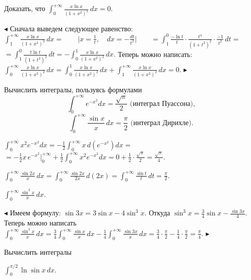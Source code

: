 \documentclass[a5paper,10pt]{article}
\begin{document}
\medskip
{} Доказать, что $\displaystyle \int_{0}^{+\infty}
\frac{x\ln x}{(1+x^2)^2}\,dx=0$.

\smallskip
\noindent $\blacktriangleleft$ Сначала выведем следующее равенство:\\
$\displaystyle \int_{1}^{+\infty}\frac{x\ln x}{(1+x^2)^2}\,dx=\qquad\Big|x=\frac1t,\quad dx=-\frac{dt}{t^2}\Big|\qquad =\int_{1}^{0}\frac{-\ln t}{t}\cdot\frac{t^4}{(1+t^2)^2}\cdot\frac{-1}{t^2}\,dt=$\\
$\displaystyle =\int_{1}^{0}\frac{t\ln t}{(1+t^2)^2}\,dt=-\int_{0}^{1}\frac{x\ln x}{(1+x^2)^2}\,dx.$\quad
Теперь можно написать:\\
$\displaystyle \int_{0}^{+\infty}\frac{x\ln x}{(1+x^2)^2}\,dx=
\int_{0}^{1}\frac{x\ln x}{(1+x^2)^2}\,dx+\int_{1}^{+\infty}\frac{x\ln x}{(1+x^2)^2}\,dx=0.$ $\blacktriangleright$

\bigskip\noindent Вычислить интегралы, пользуясь формулами
$$\int_0^{+\infty}e^{-x^2}dx=\frac{\sqrt\pi}{2}\mbox{ (интеграл Пуассона),}$$
$$\int_0^{+\infty}\frac{\sin x}{x}\,dx=\frac{\pi}{2}\mbox{ (интеграл Дирихле).}$$

\medskip
{} $\displaystyle \int_{0}^{+\infty}x^2e^{-x^2}dx=
-\frac12\int_{0}^{+\infty}x\,d(e^{-x^2})dx=$\\
$\displaystyle =-\frac12x\,e^{-x^2}\Big|_{0}^{+\infty}+\frac12\int_{0}^{+\infty}x^2e^{-x^2}dx=
0+\frac12\cdot\frac{\sqrt\pi}{2}=\frac{\sqrt\pi}{4}$.

\medskip
{} $\displaystyle \int_{0}^{+\infty}\frac{\sin 2x}{x}\,dx=\int_{0}^{+\infty}\frac{\sin 2x}{2x}\,d(2x)=
\int_{0}^{+\infty}\frac{\sin t}{t}\,dt=\frac{\pi}{2}$.

\medskip
{} $\displaystyle \int_{0}^{+\infty}\frac{\sin^3x}{x}\,dx$.

\smallskip
\noindent $\blacktriangleleft$ Имеем формулу: $\sin3x=3\sin x-4\sin^3x$. Откуда $\displaystyle \sin^3x=\frac34\sin x-\frac{\sin 3x}{4}$. Теперь можно написать\\
$\displaystyle \int_{0}^{+\infty}\frac{\sin^3x}{x}\,dx=\frac34\int_{0}^{+\infty}\frac{\sin x}{x}\,dx-
\frac14\int_{0}^{+\infty}\frac{\sin 3x}{x}\,dx=\frac34\cdot\frac{\pi}{2}-\frac14\cdot\frac{\pi}{2}=\frac{\pi}{4}$. $\blacktriangleright$

\bigskip\noindent Вычислить интегралы

\medskip
{} $\displaystyle \int_{0}^{\pi/2}\ln \sin x\,dx$.
\end{document}
